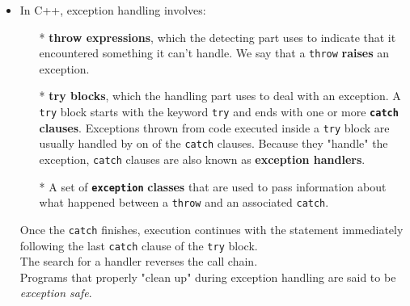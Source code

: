 \begin{itemize}
\item
In C++, exception handling involves:
\begin{itemize}
\item[*]\textbf{throw expressions}, which the detecting part uses to indicate that it encountered something it can't handle. We say that a \texttt{throw} \textbf{raises} an exception.
\item[*]\textbf{try blocks}, which the handling part uses to deal with an exception. A \texttt{try} block starts with the keyword \texttt{try} and ends with one or more \texttt{\textbf{catch}} \textbf{clauses}. Exceptions thrown from code executed inside a \texttt{try} block are usually handled by on of the \texttt{catch} clauses. Because they "handle" the exception, \texttt{catch} clauses are also known as \textbf{exception handlers}.
\item[*]A set of \texttt{\textbf{exception}} \textbf{classes} that are used to pass information about what happened between a \texttt{throw} and an associated \texttt{catch}.
\end{itemize}
Once the \texttt{catch} finishes, execution continues with the statement immediately following the last \texttt{catch} clause of the \texttt{try} block.\\
The search for a handler reverses the call chain.\\
Programs that properly "clean up" during exception handling are said to be \textit{exception safe}.

\end{itemize}